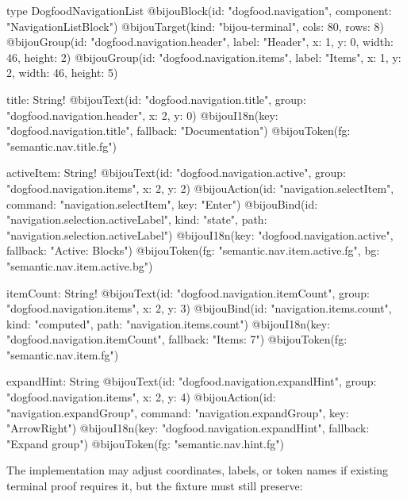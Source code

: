 \begin{CodeBlock}
type DogfoodNavigationList
  @bijouBlock(id: "dogfood.navigation", component: "NavigationListBlock")
  @bijouTarget(kind: "bijou-terminal", cols: 80, rows: 8)
  @bijouGroup(id: "dogfood.navigation.header", label: "Header", x: 1, y: 0, width: 46, height: 2)
  @bijouGroup(id: "dogfood.navigation.items", label: "Items", x: 1, y: 2, width: 46, height: 5) {
  title: String!
    @bijouText(id: "dogfood.navigation.title", group: "dogfood.navigation.header", x: 2, y: 0)
    @bijouI18n(key: "dogfood.navigation.title", fallback: "Documentation")
    @bijouToken(fg: "semantic.nav.title.fg")

  activeItem: String!
    @bijouText(id: "dogfood.navigation.active", group: "dogfood.navigation.items", x: 2, y: 2)
    @bijouAction(id: "navigation.selectItem", command: "navigation.selectItem", key: "Enter")
    @bijouBind(id: "navigation.selection.activeLabel", kind: "state", path: "navigation.selection.activeLabel")
    @bijouI18n(key: "dogfood.navigation.active", fallback: "Active: Blocks")
    @bijouToken(fg: "semantic.nav.item.active.fg", bg: "semantic.nav.item.active.bg")

  itemCount: String!
    @bijouText(id: "dogfood.navigation.itemCount", group: "dogfood.navigation.items", x: 2, y: 3)
    @bijouBind(id: "navigation.items.count", kind: "computed", path: "navigation.items.count")
    @bijouI18n(key: "dogfood.navigation.itemCount", fallback: "Items: 7")
    @bijouToken(fg: "semantic.nav.item.fg")

  expandHint: String
    @bijouText(id: "dogfood.navigation.expandHint", group: "dogfood.navigation.items", x: 2, y: 4)
    @bijouAction(id: "navigation.expandGroup", command: "navigation.expandGroup", key: "ArrowRight")
    @bijouI18n(key: "dogfood.navigation.expandHint", fallback: "Expand group")
    @bijouToken(fg: "semantic.nav.hint.fg")
}
\end{CodeBlock}

The implementation may adjust coordinates, labels, or token names if existing terminal proof requires it, but the fixture must still preserve:

